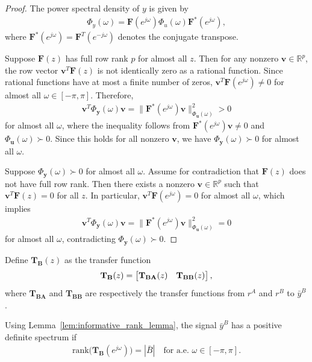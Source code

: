 \documentclass[11pt,a4paper]{article}
\begin{document}
\begin{proof}
The power spectral density of $y$ is given by
\begin{align*}
    \Phi_{y}(\omega) = \mathbf F(e^{j\omega})\Phi_{u}(\omega)\mathbf F^*(e^{j\omega}),
\end{align*}
where $\mathbf F^*(e^{j\omega}) = \mathbf F^T(e^{-j\omega})$ denotes the conjugate transpose. 

Suppose $\mathbf F(z)$ has full row rank $p$ for almost all $z$. Then for any nonzero $\mathbf v \in \mathbb{R}^p$, the row vector $\mathbf v^T\mathbf F(z)$ is not identically zero as a rational function. Since rational functions have at most a finite number of zeros, $\mathbf v^T\mathbf F(e^{j\omega}) \neq 0$ for almost all $\omega \in [-\pi, \pi]$. Therefore,
\begin{align*}
    \mathbf v^T\Phi_{\mathbf y}(\omega)\mathbf v = \|\mathbf F^*(e^{j\omega})\mathbf v\|_{\Phi_{\mathbf u}(\omega)}^2 > 0
\end{align*}
for almost all $\omega$, where the inequality follows from $\mathbf F^*(e^{j\omega})\mathbf v \neq 0$ and $\Phi_{\mathbf u}(\omega) \succ 0$. Since this holds for all nonzero $\mathbf v$, we have $\Phi_{\mathbf y}(\omega) \succ 0$ for almost all $\omega$.


Suppose $\Phi_{\mathbf y}(\omega) \succ 0$ for almost all $\omega$. Assume for contradiction that $\mathbf F(z)$ does not have full row rank. Then there exists a nonzero $\mathbf v \in \mathbb{R}^p$ such that $\mathbf v^T\mathbf F(z) = 0$ for all $z$. In particular, $\mathbf v^T\mathbf F(e^{j\omega}) = 0$ for almost all $\omega$, which implies
\begin{align*}
    \mathbf v^T\Phi_{\mathbf y}(\omega)\mathbf v = \|\mathbf F^*(e^{j\omega})\mathbf v\|_{\Phi_{\mathbf u}(\omega)}^2 = 0
\end{align*}
for almost all $\omega$, contradicting $\Phi_{\mathbf y}(\omega) \succ 0$.
\end{proof}

Define $\mathbf{ T_{B}}(z)$ as the transfer function
\begin{align*}
    \mathbf{ T_{B}}(z) = \begin{bmatrix} \mathbf{T_{BA}}(z) & \mathbf{T_{BB}}(z) \end{bmatrix},
\end{align*}
where $\mathbf{T_{BA}}$ and $\mathbf{T_{BB}}$ are respectively the transfer functions from $r^A$ and $r^B$ to $\bar y^B$. 

Using Lemma~\ref{lem:informative_rank_lemma}, the signal $\bar y^B$ has a positive definite spectrum if 
\begin{align}\label{eq:rank-condition}
    \text{rank}\bigl(\mathbf{ T_{B}}(e^{j\omega})\bigr)=|\bar B| \quad\text{for a.e.\ }\omega\in[-\pi,\pi].
\end{align}
\end{document}
